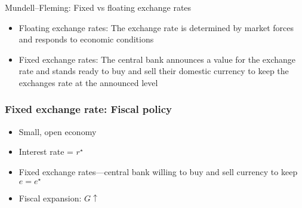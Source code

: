\documentclass[presentation,dvipsnames]{beamer}
\begin{document}
\begin{frame}[label=sec-6-3]{Mundell--Fleming: Fixed vs floating exchange rates}
\begin{itemize}[label={--}]
\item Floating exchange rates: The exchange rate is determined by market forces and responds to economic conditions
\item Fixed exchange rates: The central bank announces a value for the exchange rate and stands ready to buy and sell their domestic currency to keep the exchanges rate at the announced level
\end{itemize}
\end{frame}

\begin{frame}
\frametitle{Fixed exchange rate: Fiscal policy}
\begin{itemize}[label={--}]
\item Small, open economy
\item Interest rate = $r^{\star}$
\item Fixed exchange rates---central bank willing to buy and sell currency to keep $e = e^{\star}$
\item Fiscal expansion: $G \uparrow$
\end{itemize}
\end{frame}
\end{document}
